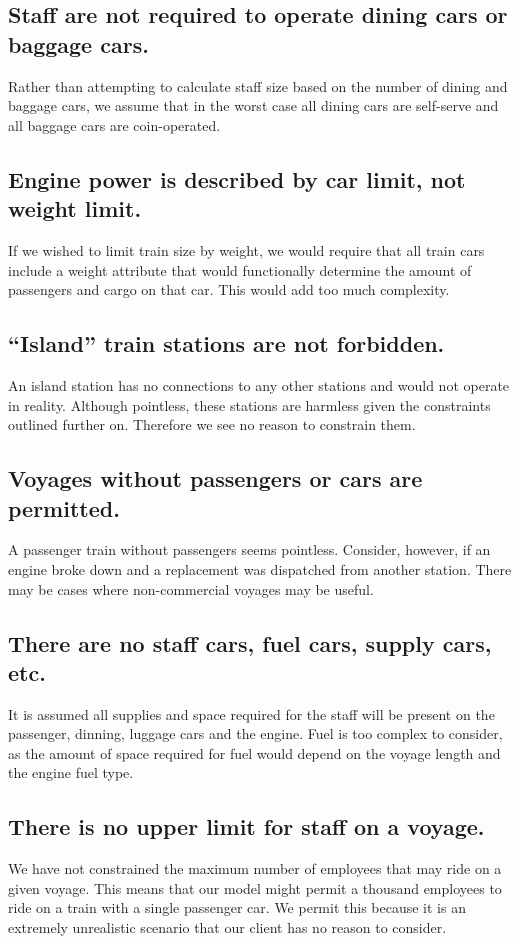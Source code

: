 \documentclass[a4paper]{article}
\begin{document}
\subsection*{Staff are not required to operate dining cars or baggage cars.}
	Rather than attempting to calculate staff size based on the number of dining and baggage cars, we assume that in the worst case all dining cars are self-serve and all baggage cars are coin-operated.
	
\subsection*{Engine power is described by car limit, not weight limit.}
If we wished to limit train size by weight, we would require that all train cars include a weight attribute that would functionally determine the amount of passengers and cargo on that car. This would add too much complexity.

\subsection*{“Island” train stations are not forbidden.}
	An island station has no connections to any other stations and would not operate in reality. Although pointless, these stations are harmless given the constraints outlined further on. Therefore we see no reason to constrain them.
    
\subsection*{Voyages without passengers or cars are permitted.}
	A passenger train without passengers seems pointless. Consider, however, if an engine broke down and a replacement was dispatched from another station. There may be cases where non-commercial voyages may be useful. 
    
\subsection*{There are no staff cars, fuel cars, supply cars, etc.}
It is assumed all supplies and space required for the staff will be present on the passenger, dinning, luggage cars and the engine. Fuel is too complex to consider, as the amount of space required for fuel would depend on the voyage length and the engine fuel type. 

\subsection*{There is no upper limit for staff on a voyage.}
We have not constrained the maximum number of employees that may ride on a given voyage. This means that our model might permit a thousand employees to ride on a train with a single passenger car. We permit this because it is an extremely unrealistic scenario that our client has no reason to consider.
\end{document}
